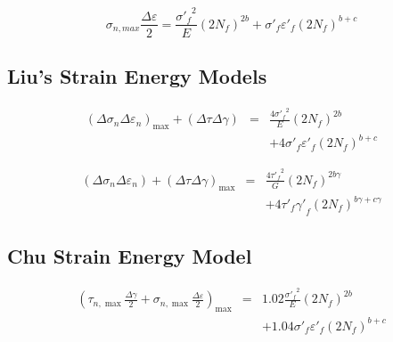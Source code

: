 \documentclass[preprint,5p,twocolumn,11pt,sort&compress]{elsarticle}
\begin{document}
\[{\sigma _{n,max}}\frac{{\Delta \varepsilon }}{2} = \frac{{{{\sigma '}_f}^2}}{E}{\left( {2{N_f}} \right)^{2b}} + {\sigma '_f}{\varepsilon '_f}{\left( {2{N_f}} \right)^{b + c}}\]

\subsection{Liu's Strain Energy Models}
\begin{eqnarray*}
{\left( {\Delta {\sigma _n}\Delta {\varepsilon _n}} \right)_{\max }} + \left( {\Delta \tau \Delta \gamma } \right) &=& \frac{{4{{\sigma '}_f}^2}}{E}{\left( {2{N_f}} \right)^{2b}}
\\
& & + 4{{\sigma '}_f}{{\varepsilon '}_f}{\left( {2{N_f}} \right)^{b + c}}
\end{eqnarray*}

\begin{eqnarray*}
\left( {\Delta {\sigma _n}\Delta {\varepsilon _n}} \right) + {\left( {\Delta \tau \Delta \gamma } \right)_{\max }} &=& \frac{{4{{\tau '}_f}^2}}{G}{\left( {2{N_f}} \right)^{2b\gamma }}
\\
&& + 4{{\tau '}_f}{{\gamma '}_f}{\left( {2{N_f}} \right)^{b\gamma  + c\gamma }}
\end{eqnarray*}

\subsection{Chu Strain Energy Model}
\begin{eqnarray*}
{\left( {{\tau _{n,\max }}\frac{{\Delta \gamma }}{2} + {\sigma _{n,\max }}\frac{{\Delta \varepsilon }}{2}} \right)_{\max }} &=& 1.02\frac{{{{\sigma '}_f}^2}}{E}{\left( {2{N_f}} \right)^{2b}} \\
&& + 1.04{{\sigma '}_f}{{\varepsilon '}_f}{\left( {2{N_f}} \right)^{b + c}}
\end{eqnarray*}
\end{document}
